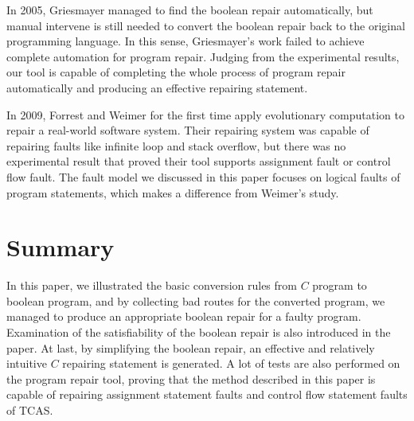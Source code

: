 \documentclass[10pt,journal,final,]{article}
\theoremstyle{definition}
\begin{document}
In 2005, Griesmayer managed to find the boolean repair automatically\cite{RoBPwaAtC}, but manual intervene is still needed to convert the boolean repair back to the original programming language.
In this sense, Griesmayer's work failed to achieve complete automation for program repair.
Judging from the experimental results, our tool is capable of completing the whole process of program repair automatically and producing an effective repairing statement.

In 2009,  Forrest and Weimer for the first time apply evolutionary computation to repair a real-world software system\cite{AFPUGP}. Their repairing system was capable of repairing faults like
infinite loop and stack overflow, but there was no experimental result that proved their tool supports assignment fault or control flow fault.
The fault model we discussed in this paper focuses on logical faults of program statements, which makes a difference from Weimer's study.

\newpage
\section{Summary}
In this paper, we illustrated the basic conversion rules from $C$ program to boolean program,
and by collecting bad routes for the converted program, we managed to produce an appropriate boolean repair for a faulty program.
Examination of the satisfiability of the boolean repair is also introduced in the paper.
At last, by simplifying the boolean repair, an effective and relatively intuitive $C$ repairing statement is generated.
A lot of tests are also performed on the program repair tool, proving that the method described in this paper is capable of repairing assignment statement faults and control flow statement faults of TCAS.
\end{document}
